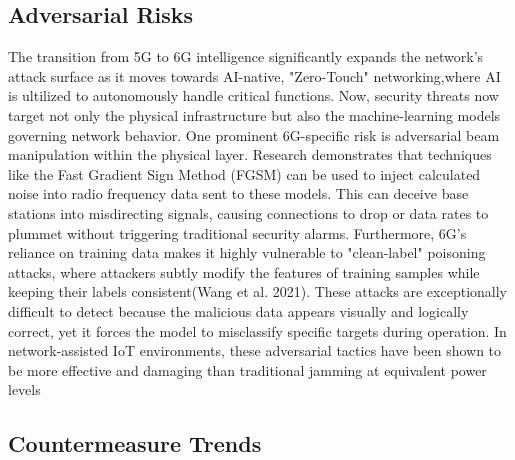 \documentclass[letterpaper]{article} %
\begin{document}
\subsection{Adversarial Risks}

The transition from 5G to 6G intelligence significantly expands the network's attack surface as it moves towards AI-native, "Zero-Touch" networking,where AI is ultilized to autonomously handle critical functions. Now, security threats now target not only the physical infrastructure but also the machine-learning models governing network behavior. 
One prominent 6G-specific risk is adversarial beam manipulation within the physical layer. Research demonstrates that techniques like the Fast Gradient Sign Method (FGSM) can be used to inject calculated noise into radio frequency data sent to these models. This can deceive base stations into misdirecting signals, causing connections to drop or data rates to plummet without triggering traditional security alarms\cite{Catak_Catak_Moldsvor_2021}. Furthermore, 6G's reliance on training data makes it highly vulnerable to "clean-label" poisoning attacks, where attackers subtly modify the features of training samples while keeping their labels consistent(Wang et al. 2021). These attacks are exceptionally difficult to detect because the malicious data appears visually and logically correct, yet it forces the model to misclassify specific targets during operation. In network-assisted IoT environments, these adversarial tactics have been shown to be more effective and damaging than traditional jamming at equivalent power levels\cite{son2024}

\subsection{Countermeasure Trends}  
\end{document}
